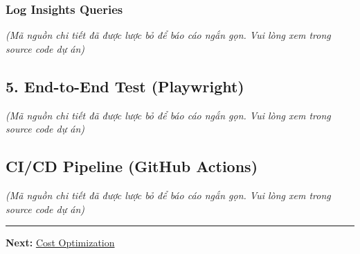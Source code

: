 \hypertarget{log-insights-queries}{%
\subsubsection{Log Insights Queries}}

\emph{(Mã nguồn chi tiết đã được lược bỏ để báo cáo ngắn gọn. Vui lòng
xem trong source code dự án)}

\hypertarget{end-to-end-test-playwright}{%
\subsection{5. End-to-End Test
(Playwright)}}

\emph{(Mã nguồn chi tiết đã được lược bỏ để báo cáo ngắn gọn. Vui lòng
xem trong source code dự án)}

\begin{Shaded}
\begin{Highlighting}[]
\end{Highlighting}
\end{Shaded}

\hypertarget{cicd-pipeline-github-actions}{%
\subsection{CI/CD Pipeline (GitHub
Actions)}}

\emph{(Mã nguồn chi tiết đã được lược bỏ để báo cáo ngắn gọn. Vui lòng
xem trong source code dự án)}

\begin{center}\rule{0.5\linewidth}{0.5pt}\end{center}

\textbf{Next:} \href{5.16-Cost/}{Cost Optimization}
